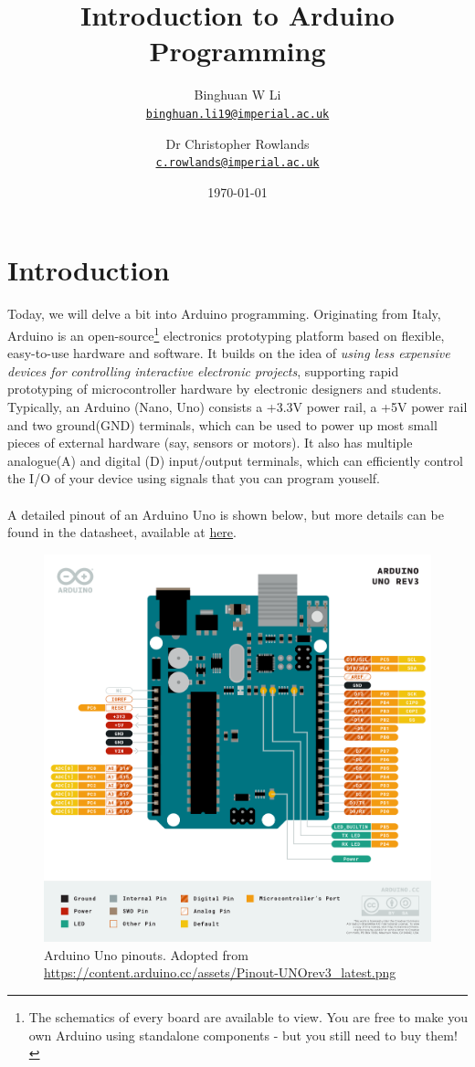 \documentclass{article}
\title{Introduction to Arduino Programming}
\author{Binghuan W Li\\ \href{mailto:binghuan.li19@imperial.ac.uk}{\texttt{binghuan.li19@imperial.ac.uk}} \and Dr Christopher Rowlands \\ \href{mailto:c.rowlands@imperial.ac.uk}{\texttt{c.rowlands@imperial.ac.uk}} }
\date{\today}
\begin{document}
\maketitle
\section{Introduction}
Today, we will delve a bit into Arduino programming. Originating from Italy, Arduino is an open-source\footnote{The schematics of every board are available to view. You are free to make you own Arduino using standalone components - but you still need to buy them!} electronics prototyping platform based on flexible, easy-to-use hardware and software. It builds on the idea of \textit{using less expensive devices for controlling interactive electronic projects}, supporting rapid prototyping of microcontroller hardware by electronic designers and students. Typically, an Arduino (Nano, Uno) consists a +3.3V power rail, a +5V power rail and two ground(GND) terminals, which can be used to power up most small pieces of external hardware (say, sensors or motors). It also has multiple analogue(A) and digital (D) input/output terminals, which can efficiently control the I/O of your device using signals that you can program youself.\\\\ A detailed pinout of an Arduino Uno is shown below, but more details can be found in the datasheet, available at  \href{https://docs.arduino.cc/static/a106feb536867b39ee791cbc8853b33e/A000066-datasheet.pdf}{here}.
\begin{figure}[H]
    \centering
    \includegraphics[width=.65\textwidth]{A000066-pinout.png}
    \caption{Arduino Uno pinouts. Adopted from \href{https://content.arduino.cc/assets/Pinout-UNOrev3_latest.png}{https://content.arduino.cc/assets/Pinout-UNOrev3\_latest.png}}
    \label{fig:pinouts}
\end{figure}
\end{document}

